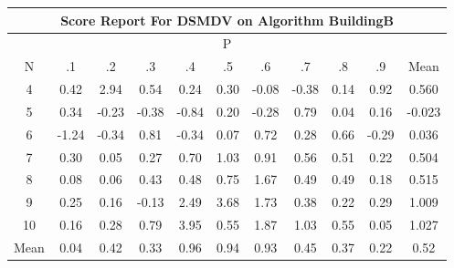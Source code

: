 \documentclass[11pt,a4paper]{report}
\begin{document}
\begin{longtable}{ | c || c | c | c | c | c | c | c | c | c || c |}
\hline
\multicolumn{11}{|c|}{ Score Report For DSMDV on Algorithm BuildingB} \\
\hline
\multicolumn{11}{|c|}{ P } \\
\hline
N & .1 & .2 & .3 & .4 & .5 & .6 & .7 & .8 & .9 & Mean\\
 \hline
 \hline
 \endhead
  4 &  \cellcolor[HTML]{F7F7FF} 0.42 &  \cellcolor[HTML]{B7B7FF} 2.94 &  \cellcolor[HTML]{EFEFFF} 0.54 &  \cellcolor[HTML]{F7F7FF} 0.24 &  \cellcolor[HTML]{F7F7FF} 0.30 &  \cellcolor[HTML]{FFFFFF} -0.08 &  \cellcolor[HTML]{FFF7F7} -0.38 &  \cellcolor[HTML]{FFFFFF} 0.14 &  \cellcolor[HTML]{E7E7FF} 0.92 & 0.560 \\
  5 &  \cellcolor[HTML]{F7F7FF} 0.34 &  \cellcolor[HTML]{FFF7F7} -0.23 &  \cellcolor[HTML]{FFF7F7} -0.38 &  \cellcolor[HTML]{FFE7E7} -0.84 &  \cellcolor[HTML]{F7F7FF} 0.20 &  \cellcolor[HTML]{FFF7F7} -0.28 &  \cellcolor[HTML]{EFEFFF} 0.79 &  \cellcolor[HTML]{FFFFFF} 0.04 &  \cellcolor[HTML]{FFFFFF} 0.16 & -0.023 \\
  6 &  \cellcolor[HTML]{FFDFDF} -1.24 &  \cellcolor[HTML]{FFF7F7} -0.34 &  \cellcolor[HTML]{E7E7FF} 0.81 &  \cellcolor[HTML]{FFF7F7} -0.34 &  \cellcolor[HTML]{FFFFFF} 0.07 &  \cellcolor[HTML]{EFEFFF} 0.72 &  \cellcolor[HTML]{F7F7FF} 0.28 &  \cellcolor[HTML]{EFEFFF} 0.66 &  \cellcolor[HTML]{FFF7F7} -0.29 & 0.036 \\
  7 &  \cellcolor[HTML]{F7F7FF} 0.30 &  \cellcolor[HTML]{FFFFFF} 0.05 &  \cellcolor[HTML]{F7F7FF} 0.27 &  \cellcolor[HTML]{EFEFFF} 0.70 &  \cellcolor[HTML]{E7E7FF} 1.03 &  \cellcolor[HTML]{E7E7FF} 0.91 &  \cellcolor[HTML]{EFEFFF} 0.56 &  \cellcolor[HTML]{EFEFFF} 0.51 &  \cellcolor[HTML]{F7F7FF} 0.22 & 0.504 \\
  8 &  \cellcolor[HTML]{FFFFFF} 0.08 &  \cellcolor[HTML]{FFFFFF} 0.06 &  \cellcolor[HTML]{F7F7FF} 0.43 &  \cellcolor[HTML]{EFEFFF} 0.48 &  \cellcolor[HTML]{EFEFFF} 0.75 &  \cellcolor[HTML]{D7D7FF} 1.67 &  \cellcolor[HTML]{EFEFFF} 0.49 &  \cellcolor[HTML]{EFEFFF} 0.49 &  \cellcolor[HTML]{F7F7FF} 0.18 & 0.515 \\
  9 &  \cellcolor[HTML]{F7F7FF} 0.25 &  \cellcolor[HTML]{F7F7FF} 0.16 &  \cellcolor[HTML]{FFFFFF} -0.13 &  \cellcolor[HTML]{BFBFFF} 2.49 &  \cellcolor[HTML]{9F9FFF} 3.68 &  \cellcolor[HTML]{D7D7FF} 1.73 &  \cellcolor[HTML]{F7F7FF} 0.38 &  \cellcolor[HTML]{F7F7FF} 0.22 &  \cellcolor[HTML]{F7F7FF} 0.29 & 1.009 \\
  10 &  \cellcolor[HTML]{F7F7FF} 0.16 &  \cellcolor[HTML]{F7F7FF} 0.28 &  \cellcolor[HTML]{EFEFFF} 0.79 &  \cellcolor[HTML]{9F9FFF} 3.95 &  \cellcolor[HTML]{EFEFFF} 0.55 &  \cellcolor[HTML]{CFCFFF} 1.87 &  \cellcolor[HTML]{E7E7FF} 1.03 &  \cellcolor[HTML]{EFEFFF} 0.55 &  \cellcolor[HTML]{FFFFFF} 0.05 & 1.027 \\
 \hline
 \hline
Mean &  \cellcolor[HTML]{FFFFFF} 0.04 &  \cellcolor[HTML]{F7F7FF} 0.42 &  \cellcolor[HTML]{F7F7FF} 0.33 &  \cellcolor[HTML]{E7E7FF} 0.96 &  \cellcolor[HTML]{E7E7FF} 0.94 &  \cellcolor[HTML]{E7E7FF} 0.93 &  \cellcolor[HTML]{F7F7FF} 0.45 &  \cellcolor[HTML]{F7F7FF} 0.37 &  \cellcolor[HTML]{F7F7FF} 0.22 &  \cellcolor[HTML]{EFEFFF} 0.52
\end{longtable}
\end{document}
